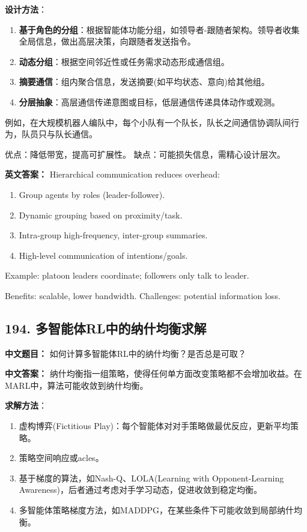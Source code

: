 \documentclass[10pt,a4paper]{ctexart}
\begin{document}
\textbf{设计方法}：
\begin{enumerate}
    \item \textbf{基于角色的分组}：根据智能体功能分组，如领导者-跟随者架构。领导者收集全局信息，做出高层决策，向跟随者发送指令。
    \item \textbf{动态分组}：根据空间邻近性或任务需求动态形成通信组。
    \item \textbf{摘要通信}：组内聚合信息，发送摘要(如平均状态、意向)给其他组。
    \item \textbf{分层抽象}：高层通信传递意图或目标，低层通信传递具体动作或观测。
\end{enumerate}

例如，在大规模机器人编队中，每个小队有一个队长，队长之间通信协调队间行为，队员只与队长通信。

优点：降低带宽，提高可扩展性。
缺点：可能损失信息，需精心设计层次。

\textbf{英文答案：}  
Hierarchical communication reduces overhead:

\begin{enumerate}
    \item Group agents by roles (leader-follower).
    \item Dynamic grouping based on proximity/task.
    \item Intra-group high-frequency, inter-group summaries.
    \item High-level communication of intentions/goals.
\end{enumerate}

Example: platoon leaders coordinate; followers only talk to leader.

Benefits: scalable, lower bandwidth.
Challenges: potential information loss.

\subsection*{194. 多智能体RL中的纳什均衡求解}
\textbf{中文题目：} 如何计算多智能体RL中的纳什均衡？是否总是可取？

\textbf{中文答案：}  
纳什均衡指一组策略，使得任何单方面改变策略都不会增加收益。在MARL中，算法可能收敛到纳什均衡。

\textbf{求解方法}：
\begin{enumerate}
    \item 虚构博弈(Fictitious Play)：每个智能体对对手策略做最优反应，更新平均策略。
    \item 策略空间响应或acles。
    \item 基于梯度的算法，如Nash-Q、LOLA(Learning with Opponent-Learning Awareness)，后者通过考虑对手学习动态，促进收敛到稳定均衡。
    \item 多智能体策略梯度方法，如MADDPG，在某些条件下可能收敛到局部纳什均衡。
\end{enumerate}
\end{document}
